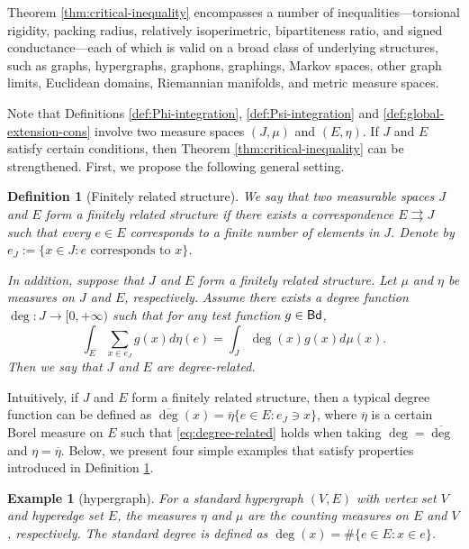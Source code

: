 \documentclass[12pt,a4paper]{article}
\newtheorem{example}[theorem]{Example}
\newtheorem{defn}[theorem]{Definition}
\begin{document}
Theorem \ref{thm:critical-inequality} encompasses a number of inequalities—torsional rigidity, packing radius, relatively isoperimetric, bipartiteness ratio, and signed conductance—each of which is valid on a broad class of underlying structures, such as graphs, hypergraphs, graphons, graphings, Markov spaces, other graph limits, Euclidean domains, Riemannian manifolds, and metric measure spaces.


\vspace{0.19cm}

Note that Definitions \ref{def:Phi-integration}, \ref{def:Psi-integration} and \ref{def:global-extension-cons} involve two measure spaces $(J,\mu)$ and $(E,\eta)$. 
If $J$ and $E$ satisfy certain conditions, then Theorem \ref{thm:critical-inequality}  can be strengthened. 
First, we propose the following general setting.
\begin{defn}[Finitely related structure]\label{def:hyper-degree-related}
We say that two measurable spaces $J$ and $E$ form a \emph{finitely related structure} if there exists a correspondence $E\rightrightarrows J$ such that every $e\in E$ corresponds to a finite number of elements in $J$. 
Denote by $e_J:=\{x\in J:e\text{ corresponds to }x\}$. 

In addition, suppose that $J$ and $E$ form a finitely related structure. Let $\mu$ and $\eta$ be measures on $J$ and $E$, respectively. Assume there exists a degree function $\deg:J\to[0,+\infty)$ such that for any test function $g\in{\sf Bd}$,
\begin{equation}\label{eq:degree-related}
\int_E \sum_{x\in e_J} g(x)d\eta(e)=\int_J\deg(x) g(x)d\mu(x) .   
\end{equation}
Then we say that $J$ and $E$ are \emph{degree-related}.
\end{defn} 

Intuitively, if $J$ and $E$ form a finitely related structure, then a typical degree function can be defined as $\overline{\deg}(x)=\overline{\eta}\{e\in E:e_J\ni x\}$, where $\overline{\eta}$ is a certain Borel measure on $E$ such that \eqref{eq:degree-related} holds when taking $\deg=\overline{\deg}$ and $\eta=\overline{\eta}$. 
Below, we present four simple examples that satisfy properties introduced in Definition \ref{def:hyper-degree-related}.
\begin{example}[hypergraph]
For a standard hypergraph $(V,E)$ with vertex set $V$ and hyperedge set $E$, the measures $\eta$ and $\mu$ are the counting measures on $E$ and $V$, respectively. The standard degree is defined as $\deg(x)=\#\{e\in E:x\in e\}$. 
\end{example}
\end{document}
